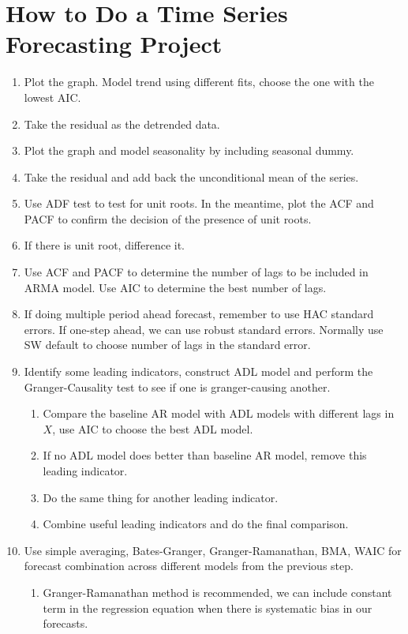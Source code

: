 \documentclass{article}
\begin{document}
\section{How to Do a Time Series Forecasting Project}
\begin{enumerate}
    \item Plot the graph. Model trend using different fits, choose the one with the lowest AIC.
    \item Take the residual as the detrended data.
    \item Plot the graph and model seasonality by including seasonal dummy.
    \item Take the residual and add back the unconditional mean of the series.
    \item Use ADF test to test for unit roots. In the meantime, plot the ACF and PACF to confirm the decision of the presence of unit roots.
    \item If there is unit root, difference it.
    \item Use ACF and PACF to determine the number of lags to be included in ARMA model. Use AIC to determine the best number of lags.
    \item If doing multiple period ahead forecast, remember to use HAC standard errors. If one-step ahead, we can use robust standard errors. Normally use SW default to choose number of lags in the standard error.
    \item Identify some leading indicators, construct ADL model and perform the Granger-Causality test to see if one is granger-causing another. 
        \begin{enumerate}
            \item Compare the baseline AR model with ADL models with different lags in $X$, use AIC to choose the best ADL model.
            \item If no ADL model does better than baseline AR model, remove this leading indicator.
            \item Do the same thing for another leading indicator. 
            \item Combine useful leading indicators and do the final comparison. 
        \end{enumerate}
    \item Use simple averaging, Bates-Granger, Granger-Ramanathan, BMA, WAIC for forecast combination across different models from the previous step.
        \begin{enumerate}
            \item Granger-Ramanathan method is recommended, we can include constant term in the regression equation when there is systematic bias in our forecasts.

\end{enumerate}
\end{enumerate}
\end{document}
